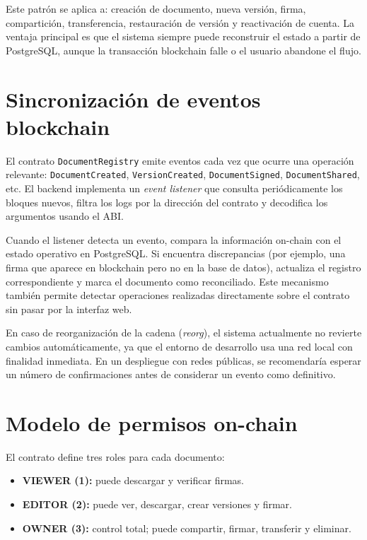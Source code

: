 \documentclass[11pt, a4paper]{article}
\begin{document}
Este patr\'on se aplica a: creaci\'on de documento, nueva versi\'on, firma, compartici\'on, transferencia, restauraci\'on de versi\'on y reactivaci\'on de cuenta. La ventaja principal es que el sistema siempre puede reconstruir el estado a partir de PostgreSQL, aunque la transacci\'on blockchain falle o el usuario abandone el flujo.

\section{Sincronizaci\'on de eventos blockchain}

El contrato \texttt{DocumentRegistry} emite eventos cada vez que ocurre una operaci\'on relevante: \texttt{DocumentCreated}, \texttt{VersionCreated}, \texttt{DocumentSigned}, \texttt{DocumentShared}, etc. El backend implementa un \textit{event listener} que consulta peri\'odicamente los bloques nuevos, filtra los logs por la direcci\'on del contrato y decodifica los argumentos usando el ABI.

Cuando el listener detecta un evento, compara la informaci\'on on-chain con el estado operativo en PostgreSQL. Si encuentra discrepancias (por ejemplo, una firma que aparece en blockchain pero no en la base de datos), actualiza el registro correspondiente y marca el documento como reconciliado. Este mecanismo tambi\'en permite detectar operaciones realizadas directamente sobre el contrato sin pasar por la interfaz web.

En caso de reorganizaci\'on de la cadena (\textit{reorg}), el sistema actualmente no revierte cambios autom\'aticamente, ya que el entorno de desarrollo usa una red local con finalidad inmediata. En un despliegue con redes p\'ublicas, se recomendar\'ia esperar un n\'umero de confirmaciones antes de considerar un evento como definitivo.

\section{Modelo de permisos on-chain}

El contrato define tres roles para cada documento:

\begin{itemize}
    \item \textbf{VIEWER (1):} puede descargar y verificar firmas.
    \item \textbf{EDITOR (2):} puede ver, descargar, crear versiones y firmar.
    \item \textbf{OWNER (3):} control total; puede compartir, firmar, transferir y eliminar.
\end{itemize}
\end{document}
